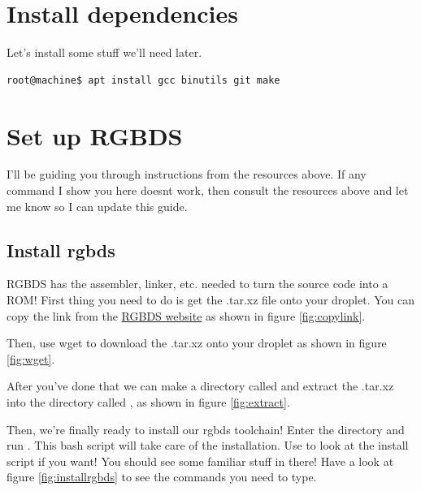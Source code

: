 \documentclass[12pt,a4]{article}
\begin{document}
\section{Install dependencies}
Let's install some stuff we'll need later.

\begin{lstlisting}[style=Term, label=listing:dependencies, caption={Install this stuff}]
root@machine$ apt install gcc binutils git make
\end{lstlisting}

\section{Set up RGBDS}
I'll be guiding you through instructions from the resources above. If any command I show you here doesnt work, then consult the resources above and let me know so I can update this guide.

\subsection{Install rgbds}
RGBDS has the assembler, linker, etc. needed to turn the source code into a ROM! First thing you need to do is get the .tar.xz file onto your droplet. You can copy the link from the \href{https://rgbds.gbdev.io/install/linux}{RGBDS website} as shown in figure \ref{fig:copylink}. 

Then, use wget to download the .tar.xz onto your droplet as shown in figure \ref{fig:wget}.

After you've done that we can make a directory called  and extract the .tar.xz into the directory called , as shown in figure \ref{fig:extract}.

Then, we're finally ready to install our rgbds toolchain! Enter the  directory and run . This bash script will take care of the installation. Use  to look at the install script if you want! You should see some familiar stuff in there! Have a look at figure \ref{fig:installrgbds} to see the commands you need to type.

\end{document}
